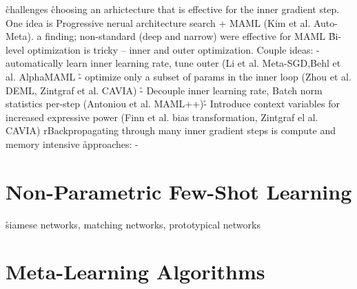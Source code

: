 


\r{challenges}
\r{choosing an arhictecture that is effective for the inner gradient step. One idea is Progressive nerual architecture search + MAML (Kim et al. Auto-Meta). a finding; non-standard (deep and narrow) were effective for MAML}
\r{Bi-level optimization is tricky -- inner and outer optimization. Couple ideas: - automatically learn inner learning rate, tune outer (Li et al. Meta-SGD,Behl et al. AlphaMAML} \r{- optimize only a subset of params in the inner loop (Zhou et al. DEML, Zintgraf et al. CAVIA)} \r{- Decouple inner learning rate, Batch norm statistics per-step (Antoniou et al. MAML++)}\r{- Introduce context variables for increased expressive power (Finn et al. bias transformation, Zintgraf el al. CAVIA)}
r{Backpropagating through many inner gradient steps is compute and memory intensive}
\r{approaches: - }


\section{Non-Parametric Few-Shot Learning}
\r{siamese networks, matching networks, prototypical networks}


\section{Meta-Learning Algorithms}
